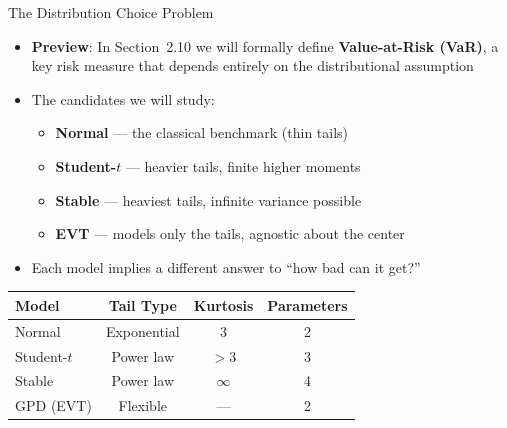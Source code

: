 \documentclass[9pt, aspectratio=169, t]{beamer}
\theoremstyle{definition}
\begin{document}
\begin{frame}{The Distribution Choice Problem}
\begin{itemize}
\item \textbf{Preview}: In Section~2.10 we will formally define \textbf{Value-at-Risk (VaR)}, a key risk measure that depends entirely on the distributional assumption
\item The candidates we will study:
\begin{itemize}
\item \textbf{Normal} --- the classical benchmark (thin tails)
\item \textbf{Student-$t$} --- heavier tails, finite higher moments
\item \textbf{Stable} --- heaviest tails, infinite variance possible
\item \textbf{EVT} --- models only the tails, agnostic about the center
\end{itemize}
\item Each model implies a different answer to ``how bad can it get?''
\end{itemize}

\vspace{0.2cm}
\begin{center}
\renewcommand{\arraystretch}{1.1}
\begin{tabular}{lccc}
\toprule
\textbf{Model} & \textbf{Tail Type} & \textbf{Kurtosis} & \textbf{Parameters} \\
\midrule
Normal & Exponential & 3 & 2 \\
Student-$t$ & Power law & $>3$ & 3 \\
Stable & Power law & $\infty$ & 4 \\
GPD (EVT) & Flexible & --- & 2 \\
\bottomrule
\end{tabular}
\end{center}
\end{frame}
\end{document}
